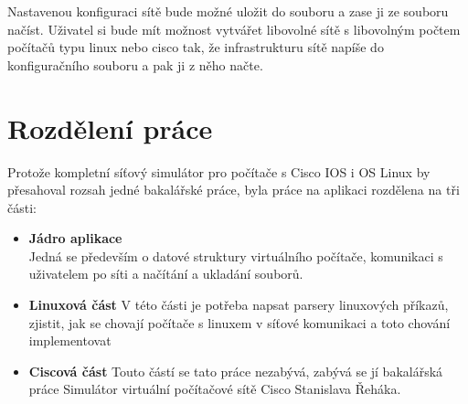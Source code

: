 Nastavenou konfiguraci sítě bude možné uložit do souboru a zase ji ze souboru načíst. Uživatel si bude mít možnost vytvářet libovolné sítě s libovolným počtem počítačů typu linux nebo cisco tak, že infrastrukturu sítě napíše do konfiguračního souboru a pak ji z něho načte.


\section{Rozdělení práce}

Protože kompletní síťový simulátor pro počítače s Cisco IOS i OS Linux by přesahoval rozsah jedné bakalářské práce, byla práce na aplikaci rozdělena na tři části:
\begin{itemize}
 \item \textbf{Jádro aplikace}\\ 
\indent Jedná se především o datové struktury virtuálního počítače, komunikaci s uživatelem po síti a načítání a ukladání souborů.
 \item \textbf{Linuxová část}
V této části je potřeba napsat parsery linuxových příkazů, zjistit, jak se chovají počítače s linuxem v síťové komunikaci a toto chování implementovat
 \item \textbf{Ciscová část}
Touto částí se tato práce nezabývá, zabývá se jí bakalářská práce Simulátor virtuální počítačové sítě Cisco Stanislava Řeháka.
\end{itemize}


